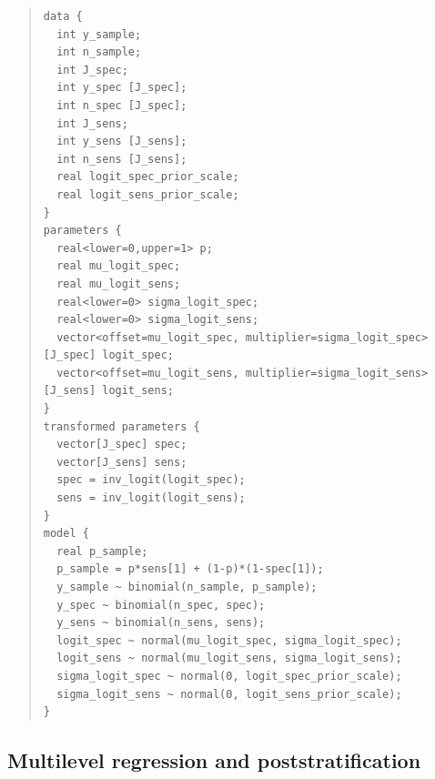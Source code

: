 \documentclass[11pt]{article}
\begin{document}
\vspace{-\baselineskip}
\begin{small}
  \begin{quotation}\noindent
\begin{verbatim}
data {
  int y_sample;
  int n_sample;
  int J_spec;
  int y_spec [J_spec];
  int n_spec [J_spec];
  int J_sens;
  int y_sens [J_sens];
  int n_sens [J_sens];
  real logit_spec_prior_scale;
  real logit_sens_prior_scale;
}
parameters {
  real<lower=0,upper=1> p;
  real mu_logit_spec;
  real mu_logit_sens;
  real<lower=0> sigma_logit_spec;
  real<lower=0> sigma_logit_sens;
  vector<offset=mu_logit_spec, multiplier=sigma_logit_spec>[J_spec] logit_spec;
  vector<offset=mu_logit_sens, multiplier=sigma_logit_sens>[J_sens] logit_sens;
}
transformed parameters {
  vector[J_spec] spec;
  vector[J_sens] sens;
  spec = inv_logit(logit_spec);
  sens = inv_logit(logit_sens);
}
model {
  real p_sample;
  p_sample = p*sens[1] + (1-p)*(1-spec[1]);
  y_sample ~ binomial(n_sample, p_sample);
  y_spec ~ binomial(n_spec, spec);
  y_sens ~ binomial(n_sens, sens);
  logit_spec ~ normal(mu_logit_spec, sigma_logit_spec);
  logit_sens ~ normal(mu_logit_sens, sigma_logit_sens);
  sigma_logit_spec ~ normal(0, logit_spec_prior_scale);
  sigma_logit_sens ~ normal(0, logit_sens_prior_scale);
}
\end{verbatim}
\end{quotation}
\end{small}

\subsection{Multilevel regression and poststratification}\label{stan4}
\end{document}
